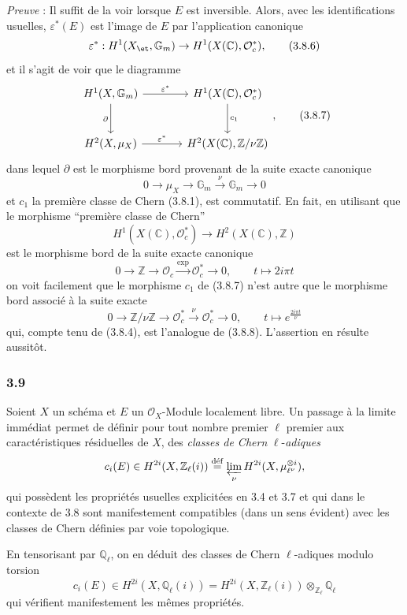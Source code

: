 \emph{Preuve} : Il suffit de la voir lorsque $E$ est inversible. Alors, avec les identifications usuelles, $\varepsilon^*(E)$ est l'image de $E$ par l'application canonique
\[
\varepsilon^*:H^1(X_{\et},\mathbb{G}_m)\to H^1(X(\mathbb{C}),\mathcal{O}_c^*),
\tag{3.8.6}
\]
et il s'agit de voir que le diagramme
\[
\begin{tikzcd}[column sep=large,row sep=large]
H^1(X,\mathbb{G}_m) \arrow[r,"\varepsilon^*"] \arrow[d,"\partial"'] &
H^1(X(\mathbb{C}),\mathcal{O}_c^*) \arrow[d,"c_1"]\\
H^2(X,\mu_X) \arrow[r,"\varepsilon^*"] &
H^2(X(\mathbb{C}),\mathbb{Z}/\nu\mathbb{Z})
\end{tikzcd},
\tag{3.8.7}
\]
dans lequel $\partial$ est le morphisme bord provenant de la suite exacte canonique
\[
0\to \mu_X\to\mathbb{G}_m\xrightarrow{\nu}\mathbb{G}_m\to0
\tag{3.8.8}
\]
et $c_1$ la première classe de Chern (3.8.1), est commutatif. En fait, en utilisant que le morphisme ``première classe de Chern''
\[
H^1(X(\mathbb{C}),\mathcal{O}_c^*)\to H^2(X(\mathbb{C}),\mathbb{Z})
\]
est le morphisme bord de la suite exacte canonique
\[
0\to\mathbb{Z}\to\mathcal{O}_c\xrightarrow{\exp}\mathcal{O}_c^*\to0,
\qquad
t\mapsto 2i\pi t
\]
on voit facilement que le morphisme $c_1$ de (3.8.7) n'est autre que le morphisme bord associé à la suite exacte
\[
0\to\mathbb{Z}/\nu\mathbb{Z}\to\mathcal{O}_c^*\xrightarrow{\nu}\mathcal{O}_c^*\to0,
\qquad
t\mapsto e^{\frac{2i\pi t}{\nu}}
\]
qui, compte tenu de (3.8.4), est l'analogue de (3.8.8). L'assertion en résulte aussitôt.

\subsubsection*{3.9}
Soient $X$ un schéma et $E$ un $\mathcal{O}_X$-Module localement libre. Un passage à la limite immédiat permet de définir pour tout nombre premier $\ell$ premier aux caractéristiques résiduelles de $X$, des \emph{classes de Chern} $\ell$-\emph{adiques}
\[
c_i(E)\in H^{2i}(X,\mathbb{Z}_\ell(i))
\stackrel{\mathrm{d\acute{e}f}}{=}\varprojlim_\nu H^{2i}(X,\mu_{\ell^\nu}^{\otimes i}),
\]
qui
possèdent les propriétés usuelles explicitées en 3.4 et 3.7 et qui dans le contexte de 3.8 sont manifestement compatibles (dans un sens évident) avec les classes de Chern définies par voie topologique.

En tensorisant par $\mathbb{Q}_\ell$, on en déduit des classes de Chern $\ell$-adiques modulo torsion
\[
c_i(E)\in H^{2i}(X,\mathbb{Q}_\ell(i))
=H^{2i}(X,\mathbb{Z}_\ell(i))\otimes_{\mathbb{Z}_\ell}\mathbb{Q}_\ell
\]
qui vérifient manifestement les mêmes propriétés.

